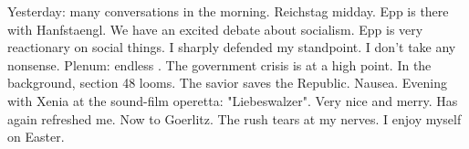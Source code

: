Yesterday: many conversations in the morning. Reichstag midday. Epp is there with Hanfstaengl.  We have an excited debate about socialism. Epp is very reactionary on social things. I sharply defended my standpoint. I don't take any nonsense. Plenum: endless . The government crisis is at a high point. In the background, section 48 looms. The savior saves the Republic. Nausea. Evening with Xenia at the sound-film operetta: "Liebeswalzer". Very nice and merry. Has again refreshed me. Now to Goerlitz. The rush tears at my nerves. I enjoy myself on Easter.

